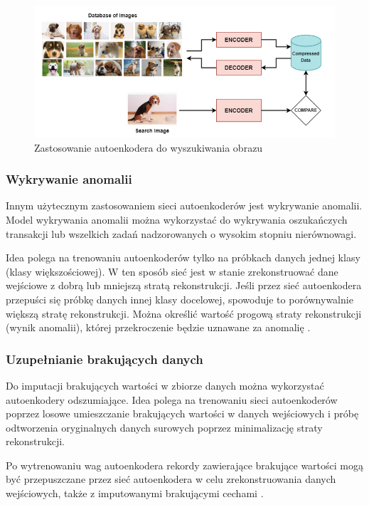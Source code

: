 \documentclass[12pt]{mwbk}
\theoremstyle{plain}
\theoremstyle{definition}
\theoremstyle{remark}
\newcommand\zrodlo[1]{\par\vspace{-3mm}{\small\textit{Źródło: }#1 }}
\begin{document}
\begin{figure}[!h]
	\centering
	\includegraphics[width=\linewidth]{rys/image_search.png}
	\caption{Zastosowanie autoenkodera do wyszukiwania obrazu}
	\zrodlo{\cite{kumar}}
	\label{fig:image-search}
\end{figure}

\subsubsection{Wykrywanie anomalii}

Innym użytecznym zastosowaniem sieci autoenkoderów jest wykrywanie anomalii. Model wykrywania anomalii można wykorzystać do wykrywania oszukańczych transakcji lub wszelkich zadań nadzorowanych o wysokim stopniu nierównowagi.

 Idea polega na trenowaniu autoenkoderów tylko na próbkach danych jednej klasy (klasy większościowej). W ten sposób sieć jest w stanie zrekonstruować dane wejściowe z dobrą lub mniejszą stratą rekonstrukcji. Jeśli przez sieć autoenkodera przepuści się próbkę danych innej klasy docelowej, spowoduje to porównywalnie większą stratę rekonstrukcji. Można określić wartość progową straty rekonstrukcji (wynik anomalii), której przekroczenie będzie uznawane za anomalię \cite{kumar}.

\subsubsection{Uzupełnianie brakujących danych}

Do imputacji brakujących wartości w zbiorze danych można wykorzystać autoenkodery odszumiające. Idea polega na trenowaniu sieci autoenkoderów poprzez losowe umieszczanie brakujących wartości w danych wejściowych i próbę odtworzenia oryginalnych danych surowych poprzez minimalizację straty rekonstrukcji.

Po wytrenowaniu wag autoenkodera rekordy zawierające brakujące wartości mogą być przepuszczane przez sieć autoenkodera w celu zrekonstruowania danych wejściowych, także z imputowanymi brakującymi cechami \cite{kumar}.
\end{document}
